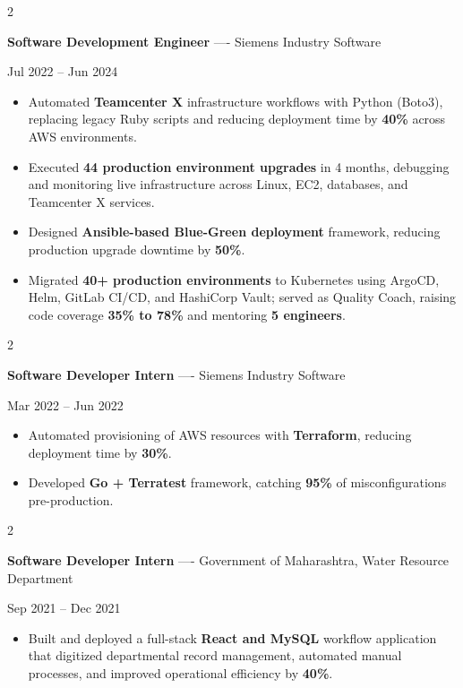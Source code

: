 \documentclass[10pt, letterpaper]{article}
\newenvironment{highlights}{
    \begin{itemize}[
        topsep=0.10 cm,
        parsep=0.06 cm,
        partopsep=0pt,
        itemsep=0.06 cm,
        leftmargin=12pt
    ]
}{
    \end{itemize}
}
\newenvironment{twocolentry}[2][]{
    \onecolentry
    \def\secondColumn{#2}
    \setcolumnwidth{\fill, 4.5 cm}
    \begin{paracol}{2}
}{
    \switchcolumn \raggedleft \secondColumn
    \end{paracol}
    \endonecolentry
}
\begin{document}
\vspace{0.15 cm}

\begin{twocolentry}{Jul 2022 -- Jun 2024}
\textbf{Software Development Engineer} ---- Siemens Industry Software
\end{twocolentry}
\begin{highlights}
  \item Automated \textbf{Teamcenter X} infrastructure workflows with Python (Boto3), replacing legacy Ruby scripts and reducing deployment time by \textbf{40\%} across AWS environments.
  \item Executed \textbf{44 production environment upgrades} in 4 months, debugging and monitoring live infrastructure across Linux, EC2, databases, and Teamcenter X services.
  \item Designed \textbf{Ansible-based Blue-Green deployment} framework, reducing production upgrade downtime by \textbf{50\%}.
  \item Migrated \textbf{40+ production environments} to Kubernetes using ArgoCD, Helm, GitLab CI/CD, and HashiCorp Vault; served as Quality Coach, raising code coverage \textbf{35\% to 78\%} and mentoring \textbf{5 engineers}.
\end{highlights}

\vspace{0.15 cm}

\begin{twocolentry}{Mar 2022 -- Jun 2022}
\textbf{Software Developer Intern} ---- Siemens Industry Software
\end{twocolentry}
\begin{highlights}
  \item Automated provisioning of AWS resources with \textbf{Terraform}, reducing deployment time by \textbf{30\%}.
  \item Developed \textbf{Go + Terratest} framework, catching \textbf{95\%} of misconfigurations pre-production.
\end{highlights}

\vspace{0.15 cm}

\begin{twocolentry}{Sep 2021 -- Dec 2021}
\textbf{Software Developer Intern} ---- Government of Maharashtra, Water Resource Department
\end{twocolentry}
\begin{highlights}
  \item Built and deployed a full-stack \textbf{React and MySQL} workflow application that digitized departmental record management, automated manual processes, and improved operational efficiency by \textbf{40\%}.
\end{highlights}
\end{document}
